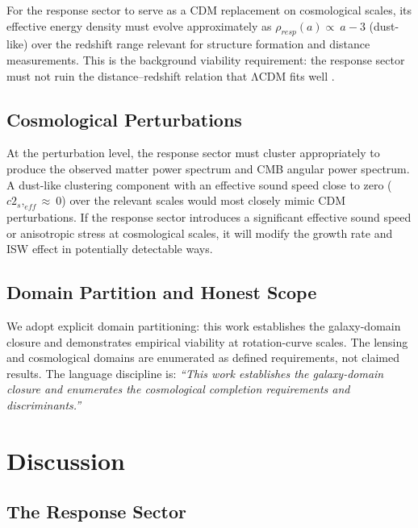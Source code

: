 \documentclass[11pt]{article}
\begin{document}
For the response sector to serve as a CDM replacement on cosmological scales, its effective energy density must evolve approximately as \(\rho_{resp}(a) \propto \ a - 3\) (dust-like) over the redshift range relevant for structure formation and distance measurements. This is the background viability requirement: the response sector must not ruin the distance--redshift relation that ΛCDM fits well \citep{Buchert2000Averaging, Rasanen2006Backreaction, Riess2019LMC}.

\subsection{Cosmological Perturbations}\label{cosmological-perturbations}

At the perturbation level, the response sector must cluster appropriately to produce the observed matter power spectrum and CMB angular power spectrum. A dust-like clustering component with an effective sound speed close to zero (\(c2_{s},_{eff} \approx \ 0\)) over the relevant scales would most closely mimic CDM perturbations. If the response sector introduces a significant effective sound speed or anisotropic stress at cosmological scales, it will modify the growth rate and ISW effect in potentially detectable ways.

\subsection{Domain Partition and Honest Scope}\label{domain-partition-and-honest-scope}

We adopt explicit domain partitioning: this work establishes the galaxy-domain closure and demonstrates empirical viability at rotation-curve scales. The lensing and cosmological domains are enumerated as defined requirements, not claimed results. The language discipline is: \emph{``This work establishes the galaxy-domain closure and enumerates the cosmological completion requirements and discriminants.''}


\section{Discussion}\label{discussion}

\subsection{The Response Sector}\label{the-response-sector}
\end{document}
